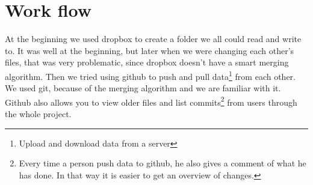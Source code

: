 \chapter{Work flow}
At the beginning we used dropbox to create a folder we all could read and write to. It was well at the beginning, but later when we were changing each other's files, that was very problematic, since dropbox doesn't have a smart merging algorithm.
Then we tried using github to push and pull data\footnote{Upload and download data from a server} from each other. We used git, because of the merging algorithm and we are familiar with it.\\
Github also allows you to view older files and list commits\footnote{Every time a person push data to github, he also gives a comment of what he has done. In that way it is easier to get an overview of changes.} from users through the whole project.